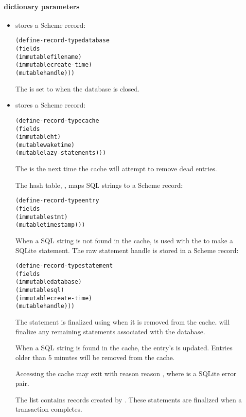 \paragraph* {dictionary parameters}
\begin{itemize}

\item {} stores a Scheme record:
  \begin{alltt}
(define-record-type database
  (fields
   (immutable filename)
   (immutable create-time)
   (mutable handle)))
  \end{alltt}\antipar
  The  is set to  when the database is closed.

\item {} stores a Scheme record:
  \begin{alltt}
(define-record-type cache
  (fields
   (immutable ht)
   (mutable waketime)
   (mutable lazy-statements)))
  \end{alltt}\antipar
  The  is the next time the cache will attempt to
  remove dead entries.

  The hash table, , maps SQL strings to a Scheme record:
  \begin{alltt}
(define-record-type entry
  (fields
   (immutable stmt)
   (mutable timestamp)))
  \end{alltt}\antipar

  When a SQL string is not found in the cache,
   is used with the
   to make a SQLite statement. The raw
  statement handle is stored in a Scheme record:
  \begin{alltt}
(define-record-type statement
  (fields
   (immutable database)
   (immutable sql)
   (immutable create-time)
   (mutable handle)))
  \end{alltt}\antipar
  The statement is finalized using 
  when it is removed from the cache.  will
  finalize any remaining statements associated with the database.

  When a SQL string is found in the cache, the entry's
   is updated. Entries older than 5 minutes will
  be removed from the cache.

  Accessing the cache may exit with reason reason
  , where
   is a SQLite error pair.

  The  list contains 
  records created by . These statements are
  finalized when a transaction completes.

\end{itemize}

